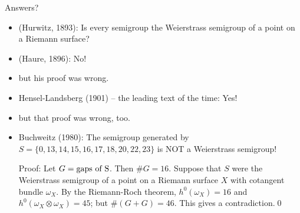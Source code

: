 \documentclass[12pt, aspectratio=169]{beamer}
\begin{document}
\begin{frame}{Answers?}
 
\begin{itemize}
 \item<1-6> (Hurwitz, 1893): Is every semigroup the Weierstrass semigroup of a point
on a Riemann surface?
\item <2-6> \qquad (Haure, 1896): No!
\item<3-6> \qquad\qquad but his proof was wrong.
\item<4-6> \qquad Hensel-Landsberg (1901) -- the leading text of the time: Yes!
\item<5-6> \qquad\qquad but that proof was wrong, too.
\item<6> \qquad Buchweitz (1980): The semigroup generated by
$S = \{0, 13, 14, 15, 16, 17, 18, 20, 22, 23\} $ is NOT a Weierstrass semigroup! 
\smallskip

Proof: Let $G= \hbox{gaps of S}$. Then $\#G = 16$. Suppose that $S$ were the Weierstrass semigroup
of a point on a Riemann surface $X$ with cotangent bundle $\omega_X$. By the Riemann-Roch theorem,
$h^0(\omega_X) = 16$ and $h^0(\omega_X\otimes \omega_X) = 45$; but $\#(G+G) = 46$. This gives a  contradiction.\qed
\end{itemize}

%
%
%

\end{frame}
\end{document}
